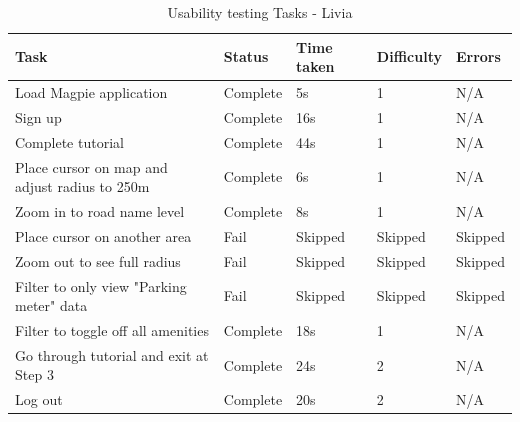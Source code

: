 \begin{table}[h!]
    \centering
    \caption{Usability testing Tasks - Livia}
    \begin{tabular}{|p{}|p{}|p{}|p{}|p{}|}
        \hline
        \textbf{Task}                                 & \textbf{Status} & \textbf{Time taken} & \textbf{Difficulty} & \textbf{Errors} \\
        \hline
        Load Magpie application                       & Complete        & 5s                  & 1                   & N/A             \\
        \hline
        Sign up                                       & Complete        & 16s                 & 1                   & N/A             \\
        \hline
        Complete tutorial                             & Complete        & 44s                 & 1                   & N/A             \\
        \hline
        Place cursor on map and adjust radius to 250m & Complete        & 6s                  & 1                   & N/A             \\
        \hline
        Zoom in to road name level                    & Complete        & 8s                  & 1                   & N/A             \\
        \hline
        Place cursor on another area                  & Fail            & Skipped             & Skipped             & Skipped         \\
        \hline
        Zoom out to see full radius                   & Fail            & Skipped             & Skipped             & Skipped         \\
        \hline
        Filter to only view "Parking meter" data      & Fail            & Skipped             & Skipped             & Skipped         \\
        \hline
        Filter to toggle off all amenities            & Complete        & 18s                 & 1                   & N/A             \\
        \hline
        Go through tutorial and exit at Step 3        & Complete        & 24s                 & 2                   & N/A             \\
        \hline
        Log out                                       & Complete        & 20s                 & 2                   & N/A             \\
        \hline
    \end{tabular}
\end{table}

